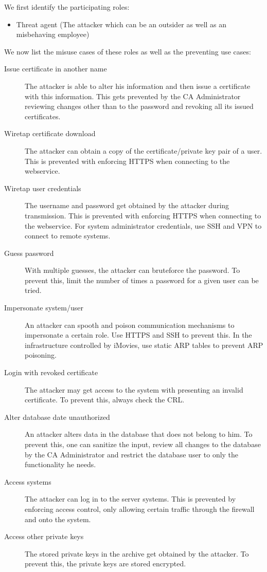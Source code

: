 \documentclass[a4paper, toc=index, 12pt, DIV14, twoside, BCOR2cm, headsepline, numbers=noenddot, bibliography=totoc]{scrbook}
\begin{document}
We first identify the participating roles:
\begin{itemize}
\item Threat agent (The attacker which can be an outsider as well as an misbehaving employee)
\end{itemize}
We now list the misuse cases of these roles as well as the preventing use cases:
\begin{description}
\item[Issue certificate in another name ] The attacker is able to alter his information and then issue a certificate with this information. This gets prevented by the CA Administrator reviewing changes other than to the password and revoking all its issued certificates.
\item[Wiretap certificate download ] The attacker can obtain a copy of the certificate/private key pair of a user. This is prevented with enforcing HTTPS when connecting to the webservice.
\item[Wiretap user credentials ] The username and password get obtained by the attacker during transmission. This is prevented with enforcing HTTPS when connecting to the webservice. For system administrator credentials, use SSH and VPN to connect to remote systems.
\item[Guess password ] With multiple guesses, the attacker can bruteforce the password. To prevent this, limit the number of times a password for a given user can be tried.
\item[Impersonate system/user ] An attacker can spooth and poison communication mechanisms to impersonate a certain role. Use HTTPS and SSH to prevent this. In the infrastructure controlled by iMovies, use static ARP tables to prevent ARP poisoning.
\item[Login with revoked certificate ] The attacker may get access to the system with presenting an invalid certificate. To prevent this, always check the CRL.
\item[Alter database date unauthorized ] An attacker alters data in the database that does not belong to him. To prevent this, one can sanitize the input, review all changes to the database by the CA Administrator and restrict the database user to only the functionality he needs.
\item[Access systems ] The attacker can log in to the server systems. This is prevented by enforcing access control, only allowing certain traffic through the firewall and onto the system.
\item[Access other private keys ] The stored private keys in the archive get obtained by the attacker. To prevent this, the private keys are stored encrypted.

\end{description}
\end{document}
